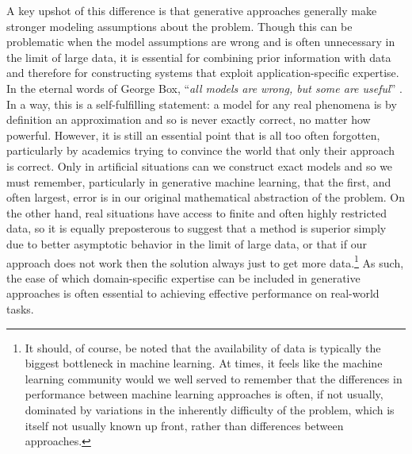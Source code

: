 A key upshot of this difference
is that generative approaches generally make stronger modeling assumptions about the problem.  Though
this can be problematic when the model assumptions are wrong and is often unnecessary in
the limit of large data, it is essential for combining prior information with data
and therefore for constructing systems that exploit application-specific expertise.
In the eternal words of George Box, ``\textit{all models are wrong, but some are useful}''
\citep{box1979robustness,box2005statistics}.  In a way, this is a self-fulfilling statement: a model for
any real phenomena
is by definition an approximation and so is never exactly correct, no matter how powerful.  However,
it is still an essential point that is all too often forgotten, particularly by academics trying to convince
the world that only their approach is correct.  Only in artificial situations can we construct exact models
and so we must remember, particularly in generative machine learning, that the first, and often largest,
error is in our original mathematical abstraction of the problem.  On the other hand, real situations
have access to finite and often highly restricted data, so it is equally preposterous to suggest that a
method is superior simply due to better asymptotic behavior in the limit of large data, or that if our approach
does not work then the solution always just to get more data.\footnote{It should, of course, be noted
	that the availability of data is typically the biggest bottleneck in machine learning.  At times, it feels 
	like the machine learning community would we well served to remember that the differences in performance between
	machine learning approaches is often, if not usually, dominated by variations in the inherently difficulty of the
	problem, which is itself not usually known up front, rather than differences between approaches.}  As such, the ease of which domain-specific
expertise can be included in generative approaches is often essential to achieving effective performance
on real-world tasks.

